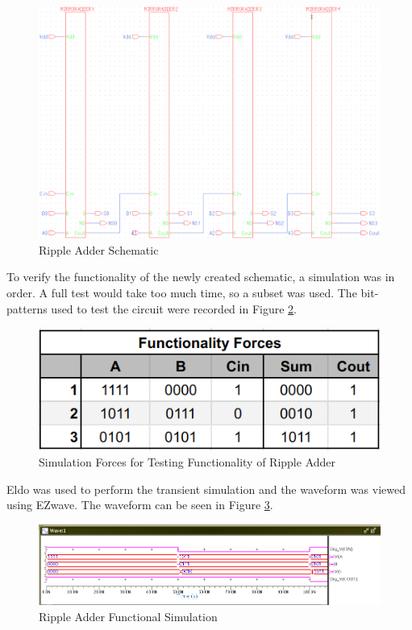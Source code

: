 \documentclass[11pt]{article}
\begin{document}
	\begin{figure}[H]
		\centering
		\includegraphics[width=0.7\linewidth]{"Pictures/RippleAdder Schematic"}
		\caption{Ripple Adder Schematic}
		\label{fig:rippleadder-schematic}
	\end{figure}
	
	To verify the functionality of the newly created schematic, a simulation was in order. A full test would take too much time, so a subset was used. The bit-patterns used to test the circuit were recorded in Figure \ref{fig:simulation-forces-for-testing-functionality-of-ripple-adder}.
	
	\begin{figure}[H]
		\centering
		\includegraphics[width=0.6\linewidth]{"Pictures/Simulation Forces for Testing Functionality of Ripple Adder"}
		\caption{Simulation Forces for Testing Functionality of Ripple Adder}
		\label{fig:simulation-forces-for-testing-functionality-of-ripple-adder}
	\end{figure}
	
	Eldo was used to perform the transient simulation and the waveform was viewed using EZwave. The waveform can be seen in Figure \ref{fig:ripple-adder-functional-sim}.
	
	\begin{figure}[H]
		\centering
		\includegraphics[width=1\linewidth]{"Pictures/Ripple Adder Functional Sim"}
		\caption{Ripple Adder Functional Simulation}
		\label{fig:ripple-adder-functional-sim}
	\end{figure}
\end{document}
